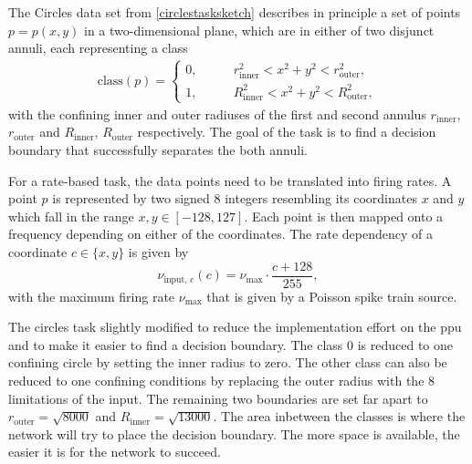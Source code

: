 The Circles data set from \cref{circlestasksketch} describes in principle a set of points $p = p(x,y)$ in a two-dimensional plane, which are in either of two disjunct annuli, each representing a class
\begin{align}
\text{class}(p) =
\begin{cases}
0 ,&\quad \quad r_{\text{inner}}^2 < x^2 + y^2 < r_{\text{outer}}^2, \\
1 ,&\quad \quad R_{\text{inner}}^2 < x^2 + y^2 < R_{\text{outer}}^2,
\end{cases}
\end{align}
with the confining inner and outer radiuses of the first and second annulus $r_{\text{inner}}$, $r_{\text{outer}}$ and  $R_{\text{inner}}$, $R_{\text{outer}}$ respectively. The goal of the task is to find a decision boundary that successfully separates the both annuli.

For a rate-based task, the data points need to be translated into firing rates. A point $p$ is represented by two signed \SI{8}{\bit} integers resembling its coordinates $x$ and $y$ which fall in the range $x, y \in [-128,127]$. Each point is then mapped onto a frequency depending on either of the coordinates. The rate dependency of a coordinate $c \in \{x,y\}$ is given by
\begin{equation}\label{inputfrequency}
\nu_{\text{input, c}}(c) = \nu_\text{max} \cdot \frac{c + 128}{255},
\end{equation}
with the maximum firing rate $\nu_\text{max}$ that is given by a Poisson spike train source. 



The circles task slightly modified to reduce the implementation effort on the \gls{ppu} and to make it easier to find a decision boundary. The class $0$ is reduced to one confining circle by setting the inner radius to zero. The other class can also be reduced to one confining conditions by replacing the outer radius with the \SI{8}{\bit} limitations of the input. The remaining two boundaries are set far apart to $r_{\text{outer}} = \sqrt{8000}$ and $R_{\text{inner}} = \sqrt{13000}$. The area inbetween the classes is where the network will try to place the decision boundary. The more space is available, the easier it is for the network to succeed.

